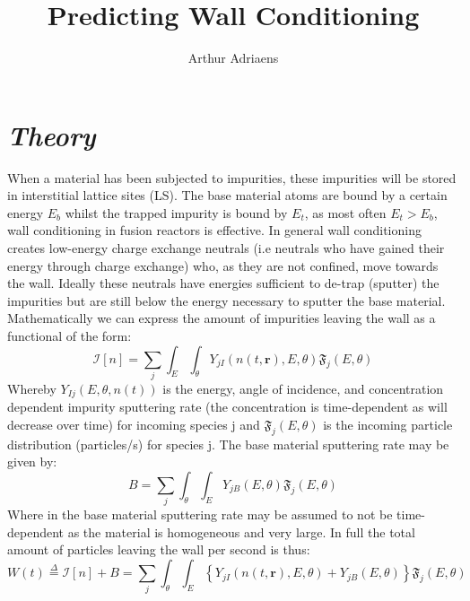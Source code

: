 \documentclass{article}
\title{Predicting Wall Conditioning}
\author{Arthur Adriaens}
\begin{document}
\maketitle
\section*{\textit{Theory}}
When a material has been subjected to impurities, these impurities will be
stored in interstitial lattice sites  (LS). The base material atoms are bound
by a certain energy $E_b$ whilst the trapped impurity is bound by $E_t$, as
most often $E_t>E_b$, wall conditioning in fusion reactors is effective.  In
general wall conditioning creates low-energy charge exchange neutrals (i.e
neutrals who have gained their energy through charge exchange) who, as they are
not confined, move towards the wall. Ideally these neutrals have energies
sufficient to de-trap (sputter) the impurities but are still below the energy
necessary to sputter the base material.  Mathematically we can express the
amount of impurities leaving the wall as a functional of the form:
\begin{equation}
    \mathcal{I}[n] = \sum_j\int_E \int_\theta Y_{jI}(n(t,\mathbf{r}),E,\theta)\mathfrak{F}_j(E,\theta)
\end{equation}
Whereby $Y_{Ij}(E,\theta,n(t))$ is the energy, angle of incidence, and
concentration dependent impurity sputtering rate (the concentration is
time-dependent as will decrease over time) for incoming species j and
$\mathfrak{F}_j(E,\theta)$ is the incoming particle distribution (particles/s)
for species j.  The base material sputtering rate may be given by:
\begin{equation}
    B = \sum_j\int_\theta \int_E Y_{jB}(E,\theta)\mathfrak{F}_j(E,\theta)
\end{equation}
Where in the base material sputtering rate may be assumed to not be
time-dependent as the material is homogeneous and very large.  In full the
total amount of particles leaving the wall per second is thus:
\begin{equation}
    W(t) \stackrel{\Delta}{=} \mathcal{I}[n] + B = \sum_j \int_\theta \int_E \left\{ Y_{jI}(n(t,\mathbf{r}),E,\theta) + Y_{jB}(E,\theta) \right\} \mathfrak{F}_j(E,\theta)
\end{equation}
\end{document}
